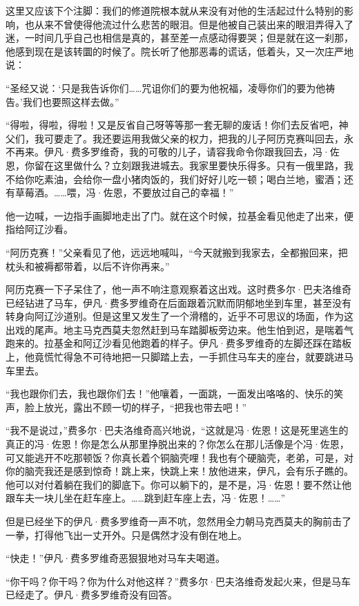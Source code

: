 \par 这里又应该下个注脚：我们的修道院根本就从来没有对他的生活起过什么特别的影响，也从来不曾使得他流过什么悲苦的眼泪。但是他被自己装出来的眼泪弄得入了迷，一时间几乎自己也相信是真的，甚至差一点感动得要哭；但是就在这一刹那，他感到现在是该转圜的时候了。院长听了他那恶毒的谎话，低着头，又一次庄严地说：
\par “圣经又说：‘只是我告诉你们……咒诅你们的要为他祝福，凌辱你们的要为他祷告。’我们也要照这样去做。”
\par “得啦，得啦，得啦！又是反省自己呀等等那一套无聊的废话！你们去反省吧，神父们，我可要走了。我还要运用我做父亲的权力，把我的儿子阿历克赛叫回去，永不再来。伊凡·费多罗维奇，我的可敬的儿子，请容我命令你跟我回去，冯·佐恩，你留在这里做什么？立刻跟我进城去。我家里要快乐得多。只有一俄里路，我不给你吃素油，会给你一盘小猪肉饭的，我们好好儿吃一顿；喝白兰地，蜜酒；还有草莓酒。……喂，冯·佐恩，不要放过自己的幸福！”
\par 他一边喊，一边指手画脚地走出了门。就在这个时候，拉基金看见他走了出来，便指给阿辽沙看。
\par “阿历克赛！”父亲看见了他，远远地喊叫，“今天就搬到我家去，全都搬回来，把枕头和被褥都带着，以后不许你再来。”
\par 阿历克赛一下子呆住了，他一声不响注意观察着这出戏。这时费多尔·巴夫洛维奇已经钻进了马车，伊凡·费多罗维奇在后面跟着沉默而阴郁地坐到车里，甚至没有转身向阿辽沙道别。但是这里又发生了一个滑稽的，近乎不可思议的场面，作为这出戏的尾声。地主马克西莫夫忽然赶到马车踏脚板旁边来。他生怕到迟，是喘着气跑来的。拉基金和阿辽沙看见他跑着的样子。伊凡·费多罗维奇的左脚还踩在踏板上，他竟慌忙得急不可待地把一只脚踏上去，一手抓住马车夫的座台，就要跳进马车里去。
\par “我也跟你们去，我也跟你们去！”他嚷着，一面跳，一面发出咯咯的、快乐的笑声，脸上放光，露出不顾一切的样子，“把我也带去吧！”
\par “我不是说过，”费多尔·巴夫洛维奇高兴地说，“这就是冯·佐恩！这是死里逃生的真正的冯·佐恩！你是怎么从那里挣脱出来的？你怎么在那儿活像是个冯·佐恩，可又能逃开不吃那顿饭？你真长着个铜脑壳哩！我也有个硬脑壳，老弟，可是，对你的脑壳我还是感到惊奇！跳上来，快跳上来！放他进来，伊凡，会有乐子瞧的。他可以对付着躺在我们的脚底下。你可以躺下的，是不是，冯·佐恩！要不然让他跟车夫一块儿坐在赶车座上。……跳到赶车座上去，冯·佐恩！……”
\par 但是已经坐下的伊凡·费多罗维奇一声不吭，忽然用全力朝马克西莫夫的胸前击了一拳，打得他飞出一丈开外。只是偶然才没有倒在地上。
\par “快走！”伊凡·费多罗维奇恶狠狠地对马车夫喝道。
\par “你干吗？你干吗？你为什么对他这样？”费多尔·巴夫洛维奇发起火来，但是马车已经走了。伊凡·费多罗维奇没有回答。
